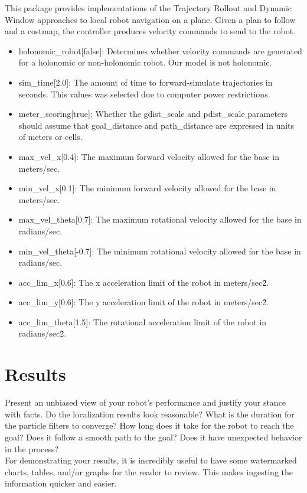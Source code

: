 \documentclass[10pt,journal,compsoc]{IEEEtran}
\begin{document}
This package provides implementations of the Trajectory Rollout and Dynamic Window approaches to local robot navigation on a plane. Given a plan to follow and a costmap, the controller produces velocity commands to send to the robot.

\begin{itemize}
\item holonomic\_robot[false]: Determines whether velocity commands are generated for a holonomic or non-holonomic robot. Our model is not holonomic.
\item sim\_time[2.0]: The amount of time to forward-simulate trajectories in seconds. This values was selected due to computer power restrictions.
\item meter\_scoring[true]: Whether the gdist\_scale and pdist\_scale parameters should assume that goal\_distance and path\_distance are expressed in units of meters or cells.
\item max\_vel\_x[0.4]: The maximum forward velocity allowed for the base in meters/sec.
\item min\_vel\_x[0.1]: The minimum forward velocity allowed for the base in meters/sec.
\item max\_vel\_theta[0.7]: The maximum rotational velocity allowed for the base in radians/sec.
\item min\_vel\_theta[-0.7]: The minimum rotational velocity allowed for the base in radians/sec.
\item acc\_lim\_x[0.6]: The x acceleration limit of the robot in meters/sec\^2.
\item acc\_lim\_y[0.6]: The y acceleration limit of the robot in meters/sec\^2.
\item acc\_lim\_theta[1.5]: The rotational acceleration limit of the robot in radians/sec\^2.
\end{itemize}

\section{Results}
Present an unbiased view of your robot's performance and justify your stance with facts. Do the localization results look reasonable? What is the duration for the particle filters to converge? How long does it take for the robot to reach the goal? Does it follow a smooth path to the goal? Does it have unexpected behavior in the process? \\
For demonstrating your results, it is incredibly useful to have some watermarked charts, tables, and/or graphs for the reader to review. This makes ingesting the information quicker and easier.
\end{document}
